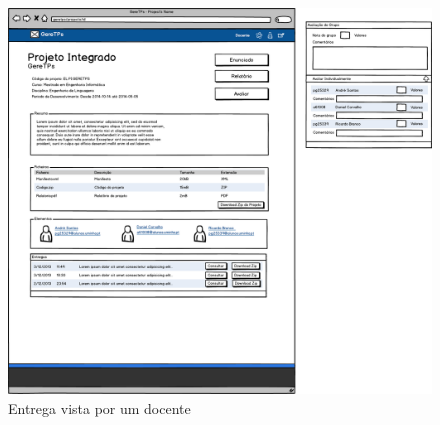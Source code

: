 \begin{figure}[htbp]
        \centering
        \includegraphics[width=1\textwidth]{images/prototipos/mockups/projetodocente.png}
         \caption{Entrega vista por um docente}
         \label{fig: projetodocente}
\end{figure}
